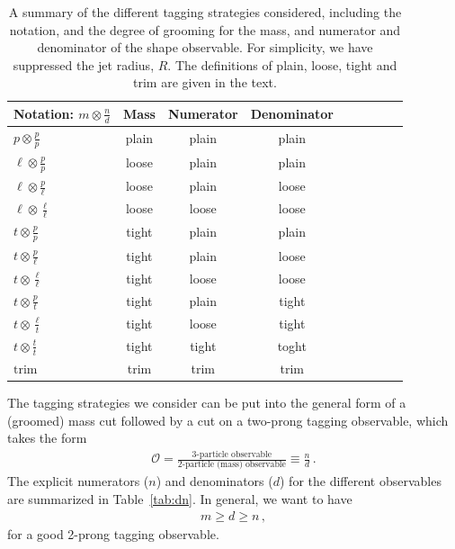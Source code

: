 \documentclass[11pt,letterpaper]{article}
\DeclareRobustCommand{\Tab}[1]{Table~\ref{#1}}
\begin{document}
\begin{table}[t!]
\begin{center}
\begin{tabular}{| l | c | c |c |c|c|c |c|r| }
  \hline                       
  Notation: $m \otimes \frac{n}{d}$ & Mass & Numerator & Denominator\\
  \hline
  $p \otimes \frac{p}{p}$ & plain  &  plain & plain \\
  $\ell \otimes \frac{p}{p}$ & loose  &  plain & plain \\
  $\ell \otimes \frac{p}{\ell}$ & loose  &  plain & loose \\
  $\ell \otimes \frac{\ell}{\ell}$ & loose  &  loose & loose \\
  $t \otimes \frac{p}{p}$ & tight  &  plain & plain \\
  $t \otimes \frac{p}{\ell}$ & tight  &  plain & loose \\
  $t \otimes \frac{\ell}{\ell}$ & tight  &  loose & loose \\
  $t \otimes \frac{p}{t}$ & tight  &  plain & tight \\
  $t \otimes \frac{\ell}{t}$ & tight  &  loose & tight \\
  $t \otimes \frac{t}{t}$ & tight  &  tight & toght \\
  \hline
  $\text{trim}$ & trim &  trim & trim \\
  \hline  
\end{tabular}
\end{center}
\caption{ A summary of the different tagging strategies considered,
  including the notation, and the degree of grooming for the mass, and
  numerator and denominator of the shape observable. For simplicity,
  we have suppressed the jet radius, $R$. The definitions of plain,
  loose, tight and trim are given in the text.}
\label{tab:tag_summary}
\end{table}

The tagging strategies we consider can be put into the general form of a (groomed) mass cut followed by a cut on a two-prong tagging observable, which takes the form
%
\begin{align}
\mathcal{O}=\frac{\text{3-particle observable}}{\text{2-particle (mass) observable}} \equiv \frac{n}{d}\,.
\end{align}
%
The explicit numerators ($n$) and denominators ($d$) for the different observables are summarized in \Tab{tab:dn}.
%
In general, we want to have
\begin{align}
m \geq d \geq n\,,
\end{align}
for a good 2-prong tagging observable.
%
\end{document}
